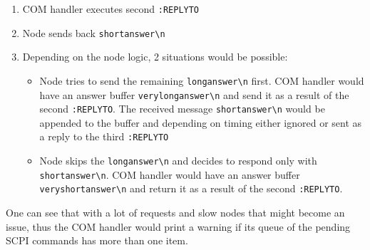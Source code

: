\begin{itemize}
{\begin{enumerate}
			\item COM handler executes second \texttt{:REPLYTO}
			\item Node sends back \texttt{shortanswer\textbackslash n}
			\item Depending on the node logic, 2 situations would be possible:
			\begin{itemize}
				\item Node tries to send the remaining \texttt{longanswer\textbackslash n} first. COM handler would have an answer buffer \texttt{verylonganswer\textbackslash n} and send it as a result of the second \texttt{:REPLYTO}. The received message \texttt{shortanswer\textbackslash n} would be appended to the buffer and depending on timing either ignored or sent as a reply to the third \texttt{:REPLYTO}
				\item Node skips the \texttt{longanswer\textbackslash n} and decides to respond only with \texttt{shortanswer\textbackslash n}. COM handler would have an answer buffer \texttt{veryshortanswer\textbackslash n} and return it as a result of the second \texttt{:REPLYTO}.
			\end{itemize}
		\end{enumerate}
		One can see that with a lot of requests and slow nodes that might become an issue, thus the COM handler would print a warning if its queue of the pending SCPI commands has more than one item.
	}
\end{itemize}